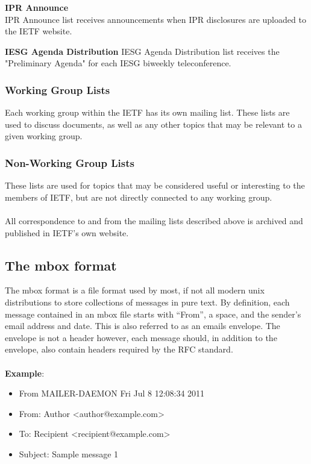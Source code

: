 \documentclass[a4paper,english]{report}
\begin{document}
\noindent
\textbf{IPR Announce}\\
IPR Announce list receives announcements when IPR disclosures are uploaded to the IETF website.

\noindent
\textbf{IESG Agenda Distribution}
IESG Agenda Distribution list receives the "Preliminary Agenda" for each IESG biweekly teleconference.

\subsubsection{Working Group Lists}
Each working group within the IETF has its own mailing list. These lists are used to discuss documents, as well as any other topics that may be relevant to a given working group.

\subsubsection{Non-Working Group Lists}
These lists are used for topics that may be considered useful or interesting to the members of IETF, but are not directly connected to any working group.\\\\




All correspondence to and from the mailing lists described above is archived and published in IETF’s own website.




\subsection{The mbox format}

The mbox format is a file format used by most, if not all modern unix distributions to store collections of messages in pure text.
By definition, each message contained in an mbox file starts with “From”, a space, and the sender’s email address and date. This is also referred to as an emails envelope. The envelope is not a header however, each message should, in addition to the envelope, also contain headers required by the RFC standard. \\\\
\textbf{Example}: 

\begin{itemize}
\item From MAILER-DAEMON Fri Jul 8 12:08:34 2011 
\item From: Author <author@example.com> 
\item To: Recipient <recipient@example.com> 
\item Subject: Sample message 1 

\end{itemize}
\end{document}
